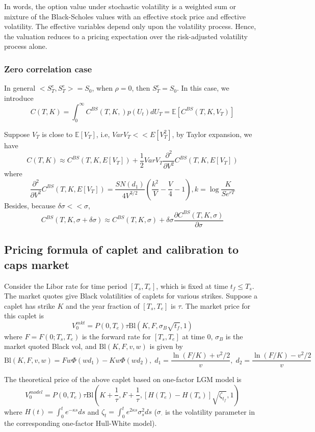 \documentclass[10pt]{article}
\theoremstyle{plain}
\numberwithin{equation}{section}
\numberwithin{table}{section}
\newcommand{\s}{\sigma}
\newcommand{\prt}[1]{\left( #1 \right)}  %
\newcommand{\de}{\delta}
\newcommand{\pa}{\partial}
\newcommand{\E}{\mathbb{E}}
\begin{document}
In words, the option value under stochastic volatility is a weighted sum or mixture of the
Black-Scholes values with an effective stock price and effective volatility. The effective
variables depend only upon the volatility process. Hence, the valuation reduces to a pricing
expectation over the risk-adjusted volatility process alone. 

\subsubsection{Zero correlation case}
In general $<S^e_T, S^e_T> = S_0$, when $\rho=0$, then $S^e_T=S_0$. In this case, we introduce 
\[
    C(T,K) = \int_0^{\infty} C^{BS}(T, K, ) p(U_t) dU_T = \E [C^{BS}(T, K, V_T)]
\]

Suppose $V_T$ is close to $\E[V_T]$, i.e, $VarV_T << E[V_T^2]$, by Taylor expansion, we have
\[
    C(T,K) \approx C^{BS}(T, K, E[V_T]) + \frac{1}{2} VarV_T \frac{\pa^2}{\pa V^2} C^{BS}(T,K,E[V_T])   
\]
where
\[
    \frac{\pa^2}{\pa V^2} C^{BS}(T,K,E[V_T])  = \frac{SN(d_1)}{4V^{3/2}}\prt{ \frac{k^2}{V} - \frac{V}{4} -1 }, k=\log \frac{K}{Se^{rT}}   
\]
Besides, because $\de \s << \s$,
\[
    C^{BS}(T, K, \s+\de \s) \approx C^{BS}(T, K, \s) + \de \s \frac{\pa C^{BS}(T, K, \s)}{\pa \s}
\]


\subsection{Pricing formula of caplet and calibration to caps market}

Consider the Libor rate for time period $[T_s, T_e]$, which is fixed at time $t_f \le T_s$. The market quotes give Black volatilities of caplets for various strikes. Suppose a caplet has strike $K$ and the year fraction of $[T_s, T_e]$ is $\tau$. The market price for this caplet is
\[
V_0^{mkt} = P(0,T_e)\tau \mbox{Bl}(K, F, \sigma_B\sqrt{t_f}, 1)
\]
where $F=F(0;T_s, T_e)$ is the forward rate for $[T_s, T_e]$ at time $0$, $\sigma_B$ is the market quoted Black vol, and $\mbox{Bl}(K,F,v,w)$ is given by
\[
\mbox{Bl}(K,F,v,w)=Fw\Phi(wd_1) - Kw\Phi(wd_2), \; d_1 = \frac{\ln(F/K)+v^2/2}{v}, \; d_2 = \frac{\ln(F/K)-v^2/2}{v}
\]

The theoretical price of the above caplet based on one-factor LGM model is
\[
V_0^{model} = P(0,T_e)\tau \mbox{Bl}\left(K+\frac{1}{\tau}, F+\frac{1}{\tau}, \left[H(T_e)-H(T_s)\right] \sqrt{\zeta_{t_f}}, 1\right)
\]
where $H(t) = \int_0^t e^{-\kappa s}ds$ and $\zeta_t = \int_0^t e^{2\kappa s}\sigma_s^2 ds$ ($\sigma_{\cdot}$ is the volatility parameter in the corresponding one-factor Hull-White model).
\end{document}
